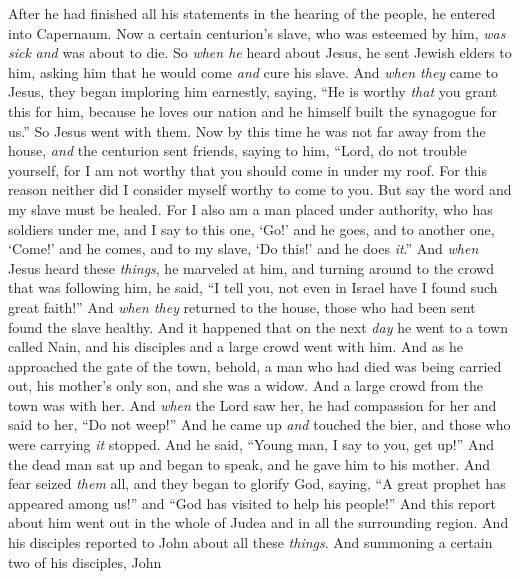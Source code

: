 \begin{biblechapter} %
 After he had finished all his statements in the hearing of the people, he entered into Capernaum.
\verse Now a certain centurion’s slave, who was esteemed by him, \textit{was sick} \textit{and} was about to die.
\verse So \textit{when he} heard about Jesus, he sent Jewish elders to him, asking him that he would come \textit{and} cure his slave.
\verse And \textit{when they} came to Jesus, they began imploring him earnestly, saying, “He is worthy \textit{that} you grant this for him,
\verse because he loves our nation and he himself built the synagogue for us.”
\verse So Jesus went with them. Now by this time he was not far away from the house, \textit{and} the centurion sent friends, saying to him, “Lord, do not trouble yourself, for I am not worthy that you should come in under my roof.
\verse For this reason neither did I consider myself worthy to come to you. But say the word and my slave must be healed.
\verse For I also am a man placed under authority, who has soldiers under me, and I say to this one, ‘Go!’ and he goes, and to another one, ‘Come!’ and he comes, and to my slave, ‘Do this!’ and he does \textit{it}.”
\verse And \textit{when} Jesus heard these \textit{things}, he marveled at him, and turning around to the crowd that was following him, he said, “I tell you, not even in Israel have I found such great faith!”
\verse And \textit{when they} returned to the house, those who had been sent found the slave healthy.
 And it happened that on the next \textit{day} he went to a town called Nain, and his disciples and a large crowd went with him.
\verse And as he approached the gate of the town, behold, a man who had died was being carried out, his mother’s only son, and she was a widow. And a large crowd from the town was with her.
\verse And \textit{when} the Lord saw her, he had compassion for her and said to her, “Do not weep!”
\verse And he came up \textit{and} touched the bier, and those who were carrying \textit{it} stopped. And he said, “Young man, I say to you, get up!”
\verse And the dead man sat up and began to speak, and he gave him to his mother.
\verse And fear seized \textit{them} all, and they began to glorify God, saying, “A great prophet has appeared among us!” and “God has visited to help his people!”
\verse And this report about him went out in the whole of Judea and in all the surrounding region.
 And his disciples reported to John about all these \textit{things}. And summoning a certain two of his disciples, John

\end{biblechapter}
